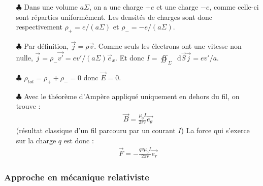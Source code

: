 \documentclass{report}
\newcommand*\dif{\mathop{}\!\mathrm{d}}
\begin{document}
\begin{itemize}
	\item[$\clubsuit$] Dans une volume $a\Sigma$, on a une charge $+e$ et une charge $-e$, comme celle-ci sont réparties uniformément. Les densités de charges sont donc respectivement $\rho_+=e/(a\Sigma)$ et $\rho_-=-e/(a\Sigma)$.
	\item[$\clubsuit$] Par définition, $\vec{j}=\rho\vec{v}$. Comme seuls les électrons ont une vitesse non nulle, $\vec{j}=\rho_-\vec{v'}=ev'/(a\Sigma)\vec{e}_x$. Et donc $I=\oiint_\Sigma\dif\vec{S}\vec{j}=ev'/a$.
	\item[$\clubsuit$] $\rho_{tot}=\rho_++\rho_-=0$ donc $\vec{E}=0$.
	\item[$\clubsuit$] Avec le théorème d'Ampère appliqué uniquement en dehors du fil, on trouve :
	\begin{align*}
		\vec{B}=\frac{\mu_0I}{2\pi r}\vec{e_\theta}
	\end{align*}
	(résultat classique d'un fil parcouru par un courant $I$)
	La force qui s'exerce sur la charge $q$ est donc :
	\begin{align*}
		\vec{F}=-\frac{qv\mu_0I}{2\pi r}\vec{e_r}
	\end{align*}
\end{itemize}

\subsubsection*{Approche en mécanique relativiste}
\end{document}
